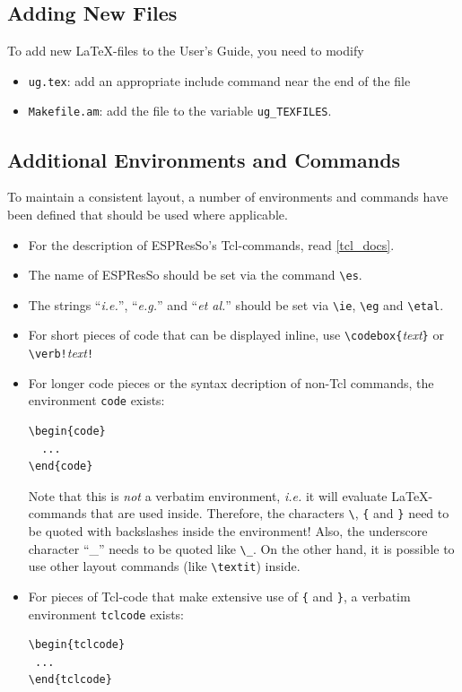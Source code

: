 \documentclass[
a4paper,                        %
11pt,                           %
twoside,                        %
footsepline,                    %
headsepline,                    %
headexclude,                    %
footexclude,                    %
pagesize,                       %
bibtotocnumbered,               %
idxtotoc                        %
]{scrreprt}
\newcommand{\es}{\mbox{\textsf{ESPResSo}}\xspace}
\newcommand{\ie}{\textit{i.e.}\xspace}
\newcommand{\eg}{\textit{e.g.}\xspace}
\newcommand{\etal}{\textit{et al.}\xspace}
\begin{document}
\subsection{Adding New Files}

To add new \LaTeX-files to the User's Guide, you need to modify
\begin{itemize}
\item \texttt{ug.tex}: add an appropriate include command near the end
  of the file
\item \texttt{Makefile.am}: add the file to the variable
  \texttt{ug\_TEXFILES}. 
\end{itemize}

\subsection{Additional Environments and Commands}

To maintain a consistent layout, a number of environments and
commands have been defined that should be used where applicable. 
\begin{itemize}
\item For the description of \es's Tcl-commands, read \ref{tcl_docs}.
\item The name of \es should be set via the command \verb!\es!.
\item The strings ``\ie'', ``\eg'' and ``\etal'' should be set via
  \verb!\ie!, \verb!\eg! and \verb!\etal!.
\item For short pieces of code that can be displayed inline, use
  \verb!\codebox{!\textit{text}\verb!}! or \verb|\verb!|\textit{text}\verb|!|
\item For longer code pieces or the syntax decription of non-Tcl
  commands, the environment \texttt{code} exists:
\begin{verbatim}
\begin{code}
  ...
\end{code}
\end{verbatim}
  Note that this is \emph{not} a verbatim environment, \ie it will
  evaluate \LaTeX-commands that are used inside. Therefore, the
  characters \verb!\!, \verb!{! and \verb!}! need to be quoted with
  backslashes inside the environment!  Also, the underscore character
  ``\_'' needs to be quoted like \verb!\_!. On the other hand, it is
  possible to use other layout commands (like \verb!\textit!) inside.
\item For pieces of Tcl-code that make extensive use of \verb!{! and
    \verb!}!, a verbatim environment \verb!tclcode! exists: 
\begin{verbatim}
\begin{tclcode}
 ...
\end{tclcode}
\end{verbatim}
\end{itemize}
\end{document}
